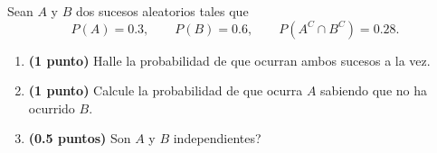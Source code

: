 
Sean $A$ y $B$ dos sucesos aleatorios tales que
\[
P(A)=0.3,\qquad P(B)=0.6,\qquad P(A^C\cap B^C)=0.28.
\]
\begin{enumerate}[label=\alph*)]
\item \textbf{(1 punto)} Halle la probabilidad de que ocurran ambos sucesos a la vez.
\item \textbf{(1 punto)} Calcule la probabilidad de que ocurra $A$ sabiendo que no ha ocurrido $B$.
\item \textbf{(0.5 puntos)} \textquestiondown{}Son $A$ y $B$ independientes?
\end{enumerate}
